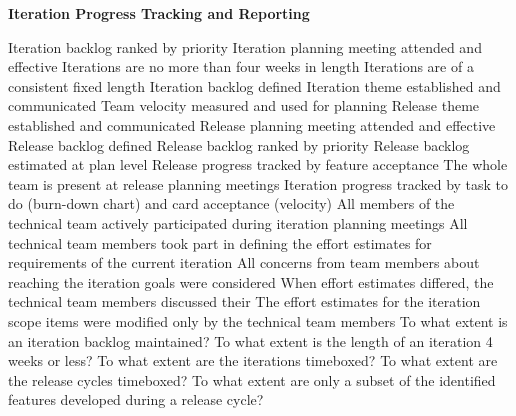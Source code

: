 \textbf{Iteration Progress Tracking and Reporting}
\begin{itemize}
	\taa Iteration backlog ranked by priority
	\taa Iteration planning meeting attended and effective
	\taa Iterations are no more than four weeks in length
	\taa Iterations are of a consistent fixed length
	\taa Iteration backlog defined %
	\taa Iteration theme established and communicated %
	\taa Team velocity measured and used for planning %
	\taa Release theme established and communicated %
	\taa Release planning meeting attended and effective %
	\taa Release backlog defined %
	\taa Release backlog ranked by priority %
	\taa Release backlog estimated at plan level %
	\taa Release progress tracked by feature acceptance%
	\taa The whole team is present at release planning meetings%
	\taa Iteration progress tracked by task to do (burn-down chart) and card acceptance (velocity)%
	\pam All members of the technical team actively participated during iteration planning meetings %
	\pam All technical team members took part in defining the effort estimates for 
requirements of the current iteration %
	\pam All concerns from team members about reaching the iteration goals were considered%
	\pam When effort estimates differed, the technical team members discussed their%
	\pam The effort estimates for the iteration scope items were modified only by the  technical team members %
	\ops To what extent is an iteration backlog maintained?
	\ops To what extent is the length of an iteration 4 weeks or less?
	\ops To what extent are the iterations timeboxed?
	\ops To what extent are the release cycles timeboxed? 
	\ops To what extent are only a subset of the identified features developed during a release cycle? 
\end{itemize}

